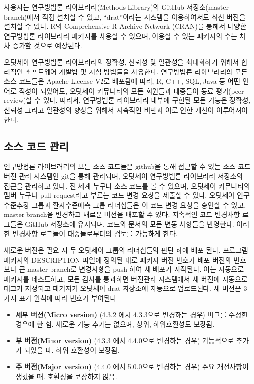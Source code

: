 \documentclass[11pt]{book}
\providecommand{\tightlist}{%
  \setlength{\itemsep}{0pt}\setlength{\parskip}{0pt}}
\theoremstyle{definition}
\theoremstyle{definition}
\theoremstyle{definition}
\theoremstyle{remark}
\begin{document}
사용자는 연구방법론 라이브러리(Methods Library)의 GitHub 저장소(master
branch)에서 직접 설치할 수 있고, ``drat''이라는 시스템을 이용하여서도
최신 버전을 설치할 수 있다. R의 Comprehensive R Archive Network (CRAN)을
통해서 다양한 연구방법론 라이브러리 패키지를 사용할 수 있으며, 이용할 수
있는 패키지의 수는 차차 증가할 것으로 예상된다.

오딧세이 연구방법론 라이브러리의 정확성, 신뢰성 및 일관성을 최대화하기
위해서 합리적인 소프트웨어 개발법 및 시험 방법들을 사용한다. 연구방법론
라이브러리의 모든 소스 코드들은 Apache License V2로 배포됨에 따라, R,
C++, SQL, Java 등 어떤 언어로 작성이 되었어도, 오딧세이 커뮤니티의 모든
회원들과 대중들이 동료 평가(peer review)할 수 있다. 따라서, 연구방법론
라이브러리 내부에 구현된 모든 기능은 정확성, 신뢰성 그리고 일관성의
향상을 위해서 지속적인 비판과 이로 인한 개선이 이루어져야 한다.

\subsection{소스 코드 관리}\label{--}

연구방법론 라이브러리의 모든 소스 코드들은 github을 통해 접근할 수 있는
소스 코드 버전 관리 시스템인 git을 통해 관리되며, 오딧세이 연구방법론
라이브러리 저장소의 접근을 관리하고 있다. 전 세계 누구나 소스 코드를 볼
수 있으며, 오딧세이 커뮤니티의 멤버 누구나 pull request라고 부르는 코드
변경 요청을 제출할 수 있다. 오딧세이 인구수준추정 그룹과 환자수준예측
그룹 리더십들은 이 코드 변경 요청을 승인할 수 있고, master branch을
변경하고 새로운 버전을 배포할 수 있다. 지속적인 코드 변경사항 로그들은
GitHub 저장소에 유지되며, 코드와 문서의 모든 변동 사항들을 반영한다.
이러한 변경사항 로그들이 대중들로부터의 검토를 가능하게 한다.

새로운 버전은 필요 시 두 오딧세이 그룹의 리더십들의 판단 하에 배포 된다.
프로그램 패키지의 DESCRIPTION 파일에 정의된 대로 패키지 버전 번호가 배포
버전의 번호보다 큰 master branch로 변경사항을 push 하여 새 배포가
시작된다. 이는 자동으로 패키지를 테스트하고, 모든 검사를 통과하면
버전관리 시스템에서 새 버전에 자동으로 태그가 지정되고 패키지가 오딧세이
drat 저장소에 자동으로 업로드된다. 새 버전은 3가지 표기 원칙에 따라
번호가 부여된다

\begin{itemize}
\tightlist
\item
  \textbf{세부 버전(Micro version)} (4.3.2 에서 4.3.3으로 변경하는 경우)
  버그를 수정한 경우에 한 함. 새로운 기능 추가는 없으며, 상위,
  하위호환성도 보장됨.
\item
  \textbf{부 버전(Minor version)} (4.3.3 에서 4.4.0으로 변경하는 경우)
  기능적으로 추가가 되었을 때. 하위 호환성이 보장됨.
\item
  \textbf{주 버전(Major version)} (4.4.0 에서 5.0.0으로 변경하는 경우)
  주요 개선사항이 생겼을 때. 호환성을 보장하지 않음.
\end{itemize}
\end{document}

